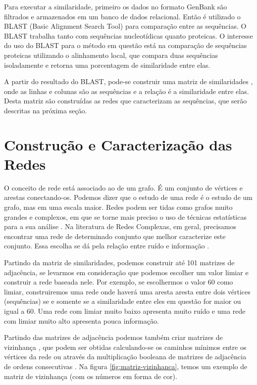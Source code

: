 Para executar a similaridade, primeiro os dados no formato GenBank são filtrados e armazenados em um banco de dados relacional. Então é utilizado o BLAST
(Basic Alignment Search Tool) \cite{blast1997} para comparação entre as sequências. O BLAST trabalha tanto com sequências nucleotídicas quanto proteicas.
O interesse do uso do BLAST para o método em questão está na comparação de sequências proteicas utilizando o alinhamento local, que compara duas sequências
isoladamente e retorna uma porcentagem de similaridade entre elas.


A partir do resultado do BLAST, pode-se construir uma matriz de similaridades \cite{andrade2006}, onde as linhas e colunas são as sequências e
a relação é a similaridade entre elas. Desta matriz são construídas as redes que caracterizam as sequências, que serão descritas na próxima seção.

\section{Construção e Caracterização das Redes} \label{sec:conscarac}

O conceito de rede está associado ao de um grafo. É um conjunto de vértices e arestas conectando-os. Podemos dizer que o estudo de uma rede é o
estudo de um grafo, mas em uma escala maior. Redes podem ser tidas como grafos muito grandes e complexos, em que se torne mais preciso o uso de
técnicas estatísticas para a sua análise \cite{bessa2008}. Na literatura de Redes Complexas, em geral, precisamos encontrar uma rede de determinado
conjunto que melhor caracterize este conjunto. Essa escolha se dá pela relação entre ruído e informação \cite{barabasi2004}.

Partindo da matriz de similaridades, podemos construir até 101 matrizes de adjacência, se levarmos em consideração que podemos escolher um valor
limiar e construir a rede baseada nele. Por exemplo, se escolhermos o valor 60 como limiar, construiremos uma rede onde haverá uma aresta aresta entre
dois vértices (sequências) se e somente se a similaridade entre eles em questão for maior ou igual a 60. Uma rede com limiar muito baixo apresenta muito
ruído e uma rede com limiar muito alto apresenta pouca informação.

Partindo das matrizes de adjacência podemos também criar matrizes de vizinhança \cite{andrade2009}, que podem ser obtidas calculando-se os caminhos mínimos
\cite{bessa2008} entre os vértices da rede ou através da multiplicação booleana de matrizes de adjacência de ordens consecutivas \cite{andrade2006}. Na figura 
\ref{fig:matriz-vizinhanca}, temos um exemplo de matriz de vizinhança (com os números em forma de cor).

